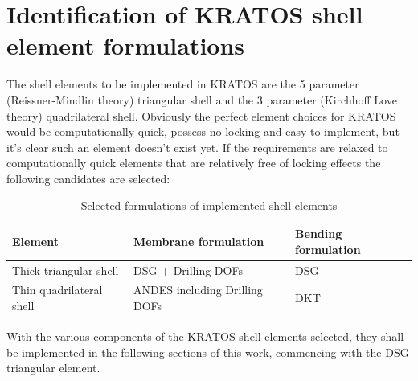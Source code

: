 \section{Identification of KRATOS shell element formulations}

The shell elements to be implemented in KRATOS are the 5 parameter (Reissner-Mindlin theory) triangular shell and the 3 parameter (Kirchhoff Love theory) quadrilateral shell. Obviously the perfect element choices for KRATOS would be computationally quick, possess no locking and easy to implement, but it's clear such an element doesn't exist yet. If the requirements are relaxed to computationally quick elements that are relatively free of locking effects the following candidates are selected:

\begin{table}[H]
	\begin{tabularx}{\textwidth}{ | l | X |  X | }
		\hline
		\textbf{Element} 		& 	\textbf{Membrane formulation}	&		\textbf{Bending formulation}	\\
		\hline
		Thick triangular shell
		&
		DSG + Drilling DOFs
		&
		DSG \\
		\hline
		Thin quadrilateral shell
		&
		ANDES including Drilling DOFs
		&
		DKT \\
		\hline
	\end{tabularx}
	\caption{Selected formulations of implemented shell elements}
	\label{table:2}
\end{table}

With the various components of the KRATOS shell elements selected, they shall be implemented in the following sections of this work, commencing with the DSG triangular element.
